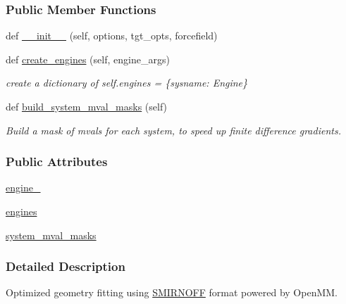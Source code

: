 \subsubsection*{Public Member Functions}
\begin{DoxyCompactItemize}
\item 
def \hyperlink{classsrc_1_1smirnoffio_1_1OptGeoTarget__SMIRNOFF_a10cdc896031c7f1fddfd4d83c777f65f}{\+\_\+\+\_\+init\+\_\+\+\_\+} (self, options, tgt\+\_\+opts, forcefield)
\item 
def \hyperlink{classsrc_1_1smirnoffio_1_1OptGeoTarget__SMIRNOFF_a1aad04b9b4211ee3766c62feab49bbda}{create\+\_\+engines} (self, engine\+\_\+args)
\begin{DoxyCompactList}\small\item\em create a dictionary of self.\+engines = \{sysname\+: Engine\} \end{DoxyCompactList}\item 
def \hyperlink{classsrc_1_1smirnoffio_1_1OptGeoTarget__SMIRNOFF_a2eeb2af9858663e85c537671bb4e104a}{build\+\_\+system\+\_\+mval\+\_\+masks} (self)
\begin{DoxyCompactList}\small\item\em Build a mask of mvals for each system, to speed up finite difference gradients. \end{DoxyCompactList}\end{DoxyCompactItemize}
\subsubsection*{Public Attributes}
\begin{DoxyCompactItemize}
\item 
\hyperlink{classsrc_1_1smirnoffio_1_1OptGeoTarget__SMIRNOFF_addc9506bbb6de983dd90a14cbd8eda37}{engine\+\_\+}
\item 
\hyperlink{classsrc_1_1smirnoffio_1_1OptGeoTarget__SMIRNOFF_ae3e5d1f61fe241c5ae78d290fdd35b2a}{engines}
\item 
\hyperlink{classsrc_1_1smirnoffio_1_1OptGeoTarget__SMIRNOFF_ad900ea245f0617dce6681e4fa54af0b5}{system\+\_\+mval\+\_\+masks}
\end{DoxyCompactItemize}


\subsubsection{Detailed Description}
Optimized geometry fitting using \hyperlink{classsrc_1_1smirnoffio_1_1SMIRNOFF}{S\+M\+I\+R\+N\+O\+FF} format powered by Open\+MM. 


